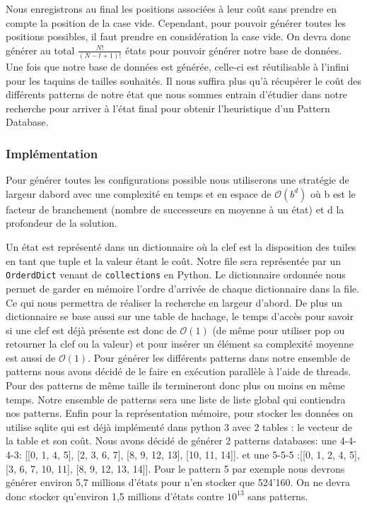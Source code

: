 \documentclass[a4paper, 12pt]{article}
\begin{document}
Nous enregistrons au final les positions associées à leur coût sans prendre en compte la position de la case vide. Cependant, pour pouvoir générer toutes les positions possibles, il faut prendre en considération la case vide. On devra donc générer au total $\frac{N!}{(N-t+1)!}$ états pour pouvoir générer notre base de données.
Une fois que notre base de données est générée, celle-ci est réutilisable à l'infini pour les taquins de tailles souhaités. Il nous suffira plus qu'à récupérer le coût des différents patterns de notre état que nous sommes entrain d'étudier dans notre recherche pour arriver à l'état final pour obtenir l'heuristique d'un Pattern Database.

\subsubsection{Implémentation}
Pour générer toutes les configurations possible nous utiliserons une stratégie de largeur dabord avec une complexité en temps et en espace de $\mathcal{O}(b^{d})$ où b est le facteur de branchement (nombre de successeurs en moyenne à un état) et d la profondeur de la solution.

Un état est représenté dans un dictionnaire où la clef est la disposition des tuiles en tant que tuple et la valeur étant le coût. Notre file sera représentée par un \lstinline{OrderdDict} venant de \lstinline{collections} en Python. Le dictionnaire ordonnée nous permet de garder en mémoire l'ordre d'arrivée de chaque dictionnaire dans la file. Ce qui nous permettra de réaliser la recherche en largeur d'abord.
De plus un dictionnaire se base aussi sur une table de hachage, le temps d'accès pour savoir si une clef est déjà présente est donc de $\mathcal{O}(1)$ (de même pour utiliser pop ou retourner la clef ou la valeur) et pour insérer un élément sa complexité moyenne est aussi de $\mathcal{O}(1)$.
Pour générer les différents patterns dans notre ensemble de patterns nous avons décidé de le faire en exécution parallèle à l'aide de threads. Pour des patterns de même taille ils termineront donc plus ou moins en même temps. Notre ensemble de patterns sera une liste de liste global qui contiendra nos patterns.
Enfin pour la représentation mémoire, pour stocker les données on utilise sqlite qui est déjà implémenté dans python 3 avec 2 tables : le vecteur de la table et son coût.
Nous avons décidé de générer 2 patterns databases: une 4-4-4-3: [[0, 1, 4, 5], [2, 3, 6, 7], [8, 9, 12, 13], [10, 11, 14]]. et une 5-5-5 :[[0, 1, 2, 4, 5], [3, 6, 7, 10, 11], [8, 9, 12, 13, 14]]. Pour le pattern 5 par exemple nous devrons générer environ 5,7 millions d'états pour n'en stocker que 524'160. On ne devra donc stocker qu'environ 1,5 millions d'états contre $10^{13}$ sans patterns.
\end{document}
